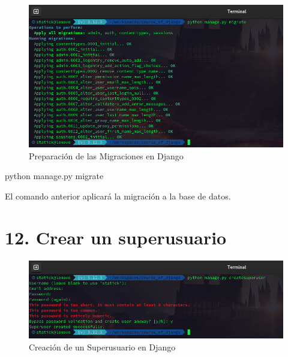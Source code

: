 \documentclass[
  a4paper,
  DIV=11,
  numbers=noendperiod,
  onepage,
  openany]{scrreprt}
\newenvironment{Shaded}{\begin{snugshade}}{\end{snugshade}}
\newcommand{\ExtensionTok}[1]{\textcolor[rgb]{0.00,0.23,0.31}{#1}}
\newcommand{\NormalTok}[1]{\textcolor[rgb]{0.00,0.23,0.31}{#1}}
\begin{document}
\begin{tcolorbox}
\begin{figure}[H]
{\centering \includegraphics{images/migraciones_django.png}

}

\caption{Preparación de las Migraciones en Django}

\end{figure}%

\begin{Shaded}
\begin{Highlighting}[]
\ExtensionTok{python}\NormalTok{ manage.py migrate}
\end{Highlighting}
\end{Shaded}

El comando anterior aplicará la migración a la base de datos.

\section{12. Crear un superusuario}\label{crear-un-superusuario}

\begin{figure}[H]

{\centering \includegraphics{images/creacion_superusuario_django.png}

}

\caption{Creación de un Superusuario en Django}

\end{figure}%


\end{tcolorbox}
\end{document}
